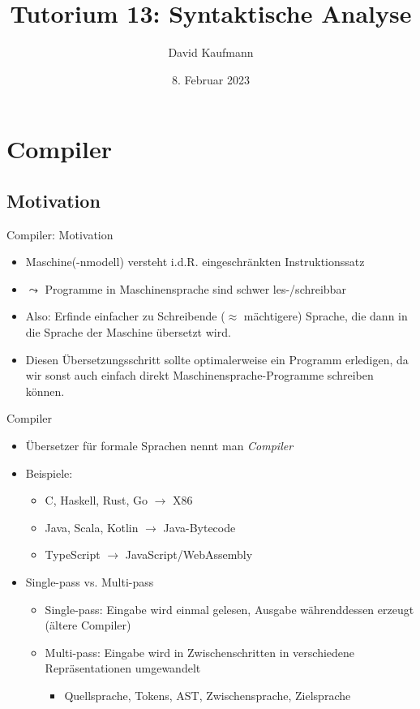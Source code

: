 \documentclass{beamer}
\title{Tutorium 13: Syntaktische Analyse}
\author{David Kaufmann}
\institute{Tutorium Programmierparadigmen am KIT}
\date{8. Februar 2023}
\begin{document}
\begin{frame}
	\titlepage
\end{frame}

\section{Compiler}

\subsection{Motivation}

\begin{frame}{Compiler: Motivation}
	\begin{itemize}
		\item Maschine(-nmodell) versteht i.d.R. eingeschränkten Instruktionssatz
		\item $\leadsto$ Programme in Maschinensprache sind schwer les-/schreibbar
		\pause
		\item Also: Erfinde einfacher zu Schreibende ($\approx$ mächtigere) Sprache, die dann in die Sprache der Maschine übersetzt wird.
		\item Diesen Übersetzungsschritt sollte optimalerweise ein Programm erledigen, da wir sonst auch einfach direkt Maschinensprache-Programme schreiben können.
	\end{itemize}
\end{frame}

\begin{frame}{Compiler}
	\begin{itemize}
		\item Übersetzer für formale Sprachen nennt man \emph{Compiler}
		\item Beispiele:
		\begin{itemize}
			\item C, Haskell, Rust, Go $\to$ X86
			\item Java, Scala, Kotlin $\to$ Java-Bytecode
			\item TypeScript $\to$ JavaScript/WebAssembly
		\end{itemize}
		\pause
		\item Single-pass vs. Multi-pass
		\begin{itemize}
			\item Single-pass: Eingabe wird einmal gelesen, Ausgabe währenddessen erzeugt (ältere Compiler)
			\item Multi-pass: Eingabe wird in Zwischenschritten in verschiedene Repräsentationen umgewandelt
			\begin{itemize}
				\item Quellsprache, Tokens, AST, Zwischensprache, Zielsprache
			\end{itemize}
		\end{itemize}
	\end{itemize}
\end{frame}
\end{document}
